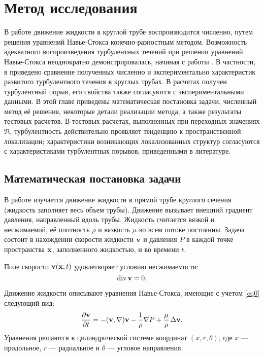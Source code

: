 
\chapter{Метод исследования}

В работе движение жидкости в круглой трубе воспроизводится численно, путем решения уравнений Навье-Стокса конечно-разностным методом. Возможность адекватного воспроизведения турбулентных течений при решении уравнений Навье-Стокса неоднократно демонстрировалась, начиная с работы \cite{Kim1987}. В частности, в \cite{Priymak1998, Nikitin2006} приведено сравнение полученных численно и экспериментально характеристик развитого турбулентного течения в круглых трубах. В расчетах \cite{Priymak2004} получен турбулентный порыв, его свойства также согласуются с экспериментальными данными. В этой главе приведены математическая постановка задачи, численный метод её решения, некоторые детали реализации метода, а также результаты тестовых расчетов. В тестовых расчетах, выполненных при переходных значениях $\Re$, турбулентность действительно проявляет тенденцию к пространственной локализации; характеристики возникающих локализованных структур согласуются с характеристиками турбулентных порывов, приведенными в литературе. 


\section{Математическая постановка задачи} \label{math_section}

В работе изучается движение жидкости в прямой трубе круглого сечения (жидкость заполняет весь объем трубы). Движение вызывает внешний градиент давления, направленный вдоль трубы. Жидкость считается вязкой и несжимаемой, её плотность $\rho$ и вязкость $\mu$ во всем потоке постоянны. Задача состоит в нахождении скорости жидкости $\mathbf{v}$ и давления $P$ в каждой точке пространства $\mathbf{x}$, заполненного жидкостью, и во времени $t$.

Поле скорости $\mathbf{v}(\mathbf{x}, t)$ удовлетворяет условию несжимаемости:
\begin{equation} \label{eq0}
\mathop{}\!\operatorname{div} \mathbf{v} = 0.
\end{equation}

Движение жидкости описывают уравнения Навье-Стокса, имеющие с учетом \eqref{eq0} следующий вид:
\begin{equation} \label{NSeq_dynamic}
\frac{\partial \mathbf{v}}{\partial t} = - (\mathbf{v}, \nabla) \mathbf{v} - \frac{1}{\rho}\nabla P + \frac{\mu}{\rho} \mathop{}\!\Delta \mathbf{v}.
\end{equation}
Уравнения решаются в цилиндрической системе координат $(x,r,\theta)$, где $x$ --- продольное, $r$ --- радиальное и $\theta$ --- угловое направления. 

